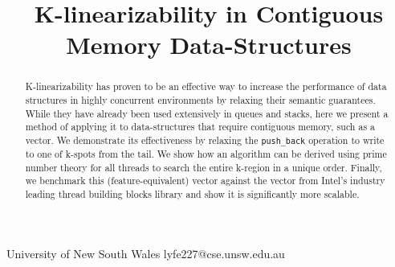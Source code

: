 \documentclass{sigplanconf}
\begin{document}
\setlength{\pdfpageheight}{\paperheight}
\setlength{\pdfpagewidth}{\paperwidth}






\title{K-linearizability in Contiguous Memory Data-Structures}

           {University of New South Wales}
           {lyfe227@cse.unsw.edu.au}

\maketitle

\newcommand{\op}{\texttt}

\begin{abstract}
K-linearizability has proven to be an effective way to increase the performance
of data structures in highly concurrent environments by relaxing their
semantic guarantees. While they have already been used extensively
in queues and stacks, here we present a method of applying it to data-structures
that require contiguous memory, such as a vector. We demonstrate
its effectiveness by relaxing the \op{push\_back} operation to write
to one of k-spots from the tail. We show how an algorithm can
be derived using prime number theory for all threads to search the
entire k-region in a unique order. Finally, we benchmark this
(feature-equivalent) vector against the vector from Intel's
industry leading thread building blocks library and show it is significantly more scalable.
\end{abstract}
\end{document}
